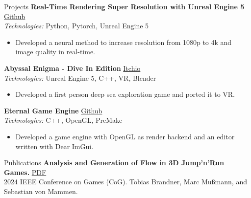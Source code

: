 \documentclass{resume} %
\begin{document}
\begin{rSection}{Projects}
{\bf Real-Time Rendering Super Resolution with Unreal Engine 5} \hfill {\href{https://github.com/BrandnerKasper/URTSR}{Github}} \\
{\small {\em Technologies:} Python, Pytorch, Unreal Engine 5}
\begin{itemize}
    \item \small Developed a neural method to increase resolution from 1080p to 4k and image quality in real-time.
\end{itemize}

{\bf Abyssal Enigma - Dive In Edition} \hfill {\href{https://miggli.itch.io/abyssal-enigma/devlog/638746/abyssal-engima-dive-in-edition-vr}{Itchio}} \\
{\small {\em Technologies:} Unreal Engine 5, C++, VR, Blender}
\begin{itemize}
    \item \small Developed a first person deep sea exploration game and ported it to VR.
\end{itemize}

{\bf Eternal Game Engine} \hfill {\href{https://github.com/BrandnerKasper/Eternal}{Github}} \\
{\small {\em Technologies:} C++, OpenGL, PreMake}
\begin{itemize}
    \item \small Developed a game engine with OpenGL as render backend and an editor written with Dear ImGui.
\end{itemize}
\end{rSection}

\begin{rSection}{Publications}
{\bf Analysis and Generation of Flow in 3D Jump’n’Run Games.} \hfill {\href{https://ieeexplore.ieee.org/abstract/document/10645536}{PDF}}\\
\small 2024 IEEE Conference on Games (CoG). Tobias Brandner, Marc Mußmann, and Sebastian von Mammen.\\

\end{rSection}
\end{document}
